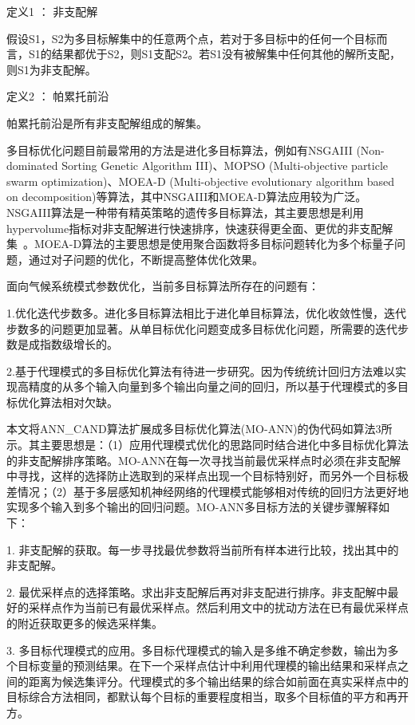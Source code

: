定义1 ： 非支配解

假设S1，S2为多目标解集中的任意两个点，若对于多目标中的任何一个目标而言，S1的结果都优于S2，则S1支配S2。若S1没有被解集中任何其他的解所支配，则S1为非支配解。

定义2 ：  帕累托前沿

帕累托前沿是所有非支配解组成的解集。

多目标优化问题目前最常用的方法是进化多目标算法，例如有NSGAIII (Non-dominated Sorting Genetic Algorithm III)、MOPSO (Multi-objective particle swarm optimization)、MOEA-D (Multi-objective evolutionary algorithm based on decomposition)等算法，其中NSGAIII和MOEA-D算法应用较为广泛。NSGAIII算法是一种带有精英策略的遗传多目标算法，其主要思想是利用hypervolume指标对非支配解进行快速排序，快速获得更全面、更优的非支配解集~\cite{deb2014evolutionary}。MOEA-D算法的主要思想是使用聚合函数将多目标问题转化为多个标量子问题，通过对子问题的优化，不断提高整体优化效果。

面向气候系统模式参数优化，当前多目标算法所存在的问题有：

1.优化迭代步数多。进化多目标算法相比于进化单目标算法，优化收敛性慢，迭代步数多的问题更加显著。从单目标优化问题变成多目标优化问题，所需要的迭代步数是成指数级增长的。

2.基于代理模式的多目标优化算法有待进一步研究。因为传统统计回归方法难以实现高精度的从多个输入向量到多个输出向量之间的回归，所以基于代理模式的多目标优化算法相对欠缺。

本文将ANN\_CAND算法扩展成多目标优化算法(MO-ANN)的伪代码如算法3所示。其主要思想是：（1）应用代理模式优化的思路同时结合进化中多目标优化算法的非支配解排序策略。MO-ANN在每一次寻找当前最优采样点时必须在非支配解中寻找，这样的选择防止选取到的采样点出现一个目标特别好，而另外一个目标极差情况；（2）基于多层感知机神经网络的代理模式能够相对传统的回归方法更好地实现多个输入到多个输出的回归问题。MO-ANN多目标方法的关键步骤解释如下：

1. 非支配解的获取。每一步寻找最优参数将当前所有样本进行比较，找出其中的非支配解。

2. 最优采样点的选择策略。求出非支配解后再对非支配进行排序。非支配解中最好的采样点作为当前已有最优采样点。然后利用文中的扰动方法在已有最优采样点的附近获取更多的候选采样集。

3. 多目标代理模式的应用。多目标代理模式的输入是多维不确定参数，输出为多个目标变量的预测结果。在下一个采样点估计中利用代理模的输出结果和采样点之间的距离为候选集评分。代理模式的多个输出结果的综合如前面在真实采样点中的目标综合方法相同，都默认每个目标的重要程度相当，取多个目标值的平方和再开方。

